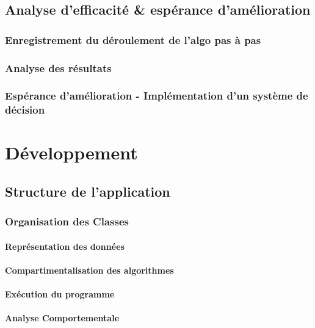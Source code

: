 \documentclass[a4paper,10pt]{report}
\begin{document}

\chapter{Analyse d'efficacité \& espérance d'amélioration}
\section{Enregistrement du déroulement de l'algo pas à pas}

\section{Analyse des résultats}

\section{Espérance d'amélioration - Implémentation d'un système de décision}

\part{Développement}
\chapter{Structure de l'application}
\section{Organisation des Classes}
\subsection{Représentation des données}

\subsection{Compartimentalisation des algorithmes}

\subsection{Exécution du programme}

\subsection{Analyse Comportementale}
\end{document}
